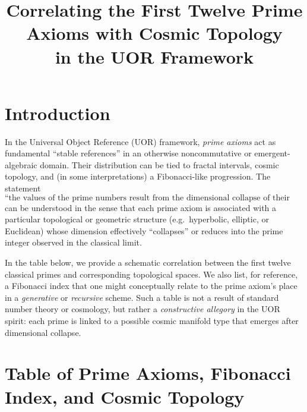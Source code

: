 \documentclass[11pt]{article}
\title{Correlating the First Twelve Prime Axioms with Cosmic Topology \\
in the UOR Framework}
\author{}
\date{}
\begin{document}
\maketitle

\section*{Introduction}
In the Universal Object Reference (UOR) framework, \emph{prime axioms} act as fundamental ``stable references'' in an otherwise noncommutative or emergent-algebraic domain.  Their distribution can be tied to fractal intervals, cosmic topology, and (in some interpretations) a Fibonacci-like progression. The statement
\[
\text{``the values of the prime numbers result from the dimensional collapse of their axiomatic spaces''}
\]
can be understood in the sense that each prime axiom is associated with a particular topological or geometric structure (e.g.\ hyperbolic, elliptic, or Euclidean) whose dimension effectively ``collapses'' or reduces into the prime integer observed in the classical limit.

In the table below, we provide a schematic correlation between the first twelve classical primes and corresponding topological spaces.  We also list, for reference, a Fibonacci index that one might conceptually relate to the prime axiom's place in a \emph{generative} or \emph{recursive} scheme.  Such a table is not a result of standard number theory or cosmology, but rather a \emph{constructive allegory} in the UOR spirit: each prime is linked to a possible cosmic manifold type that emerges after dimensional collapse.

\section*{Table of Prime Axioms, Fibonacci Index, and Cosmic Topology}
\end{document}
